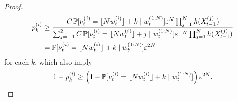 \begin{proof}
\begin{align}
p_k^{(i)} 
&\geq \frac{ C \, \mathbb{P} [ \nu_t^{(i)} = \lfloor N w_t^{(i)} \rfloor + k \mid w_t^{(1:N)} ] 
        \varepsilon^N \prod_{j=1}^N h(X_{t-1}^{(j)}) }{
        \sum_{j=-1}^2 C \, \mathbb{P} [ \nu_t^{(i)} = \lfloor N w_t^{(i)} \rfloor + j \mid w_t^{(1:N)} ] 
        \varepsilon^{-N} \prod_{j=1}^N h(X_{t-1}^{(j)}) } \notag\\
&= \mathbb{P} [ \nu_t^{(i)} = \lfloor N w_t^{(i)} \rfloor + k \mid w_t^{(1:N)} ] \varepsilon^{2N} 
        \label{eq:strat_pbounds}
\end{align}
for each $k$, which also imply
\begin{equation}
1 - p_k^{(i)} 
\geq \left( 1- \mathbb{P} [ \nu_t^{(i)} = \lfloor N w_t^{(i)} \rfloor + k \mid w_t^{(1:N)} ] \right)
        \varepsilon^{2N} . \label{eq:strat_nonpbounds}
\end{equation}


\end{proof}
